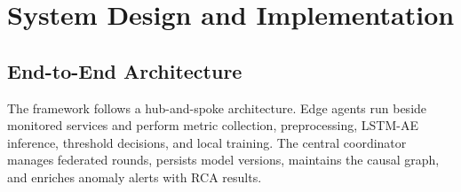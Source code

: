 \chapter{System Design and Implementation}
\label{ch:system_design}
\label{ch:reliability}

\section{End-to-End Architecture}
\label{sec:design_architecture}

The framework follows a hub-and-spoke architecture. Edge agents run beside
monitored services and perform metric collection, preprocessing, LSTM-AE
inference, threshold decisions, and local training. The central coordinator
manages federated rounds, persists model versions, maintains the causal graph,
and enriches anomaly alerts with RCA results.


